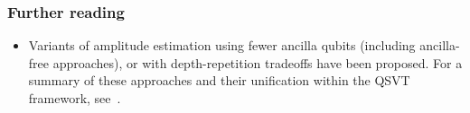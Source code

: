 \begin{refsection}
\subsubsection*{Further reading}

\begin{itemize}
    \item Variants of amplitude estimation using fewer ancilla qubits (including ancilla-free approaches), or with depth-repetition tradeoffs have been proposed. For a summary of these approaches and their unification within the QSVT framework, see~\cite{rall2022amplitude}.
\end{itemize}



\printbibliography[heading=secbib,segment=\therefsegment]

\end{refsection}

